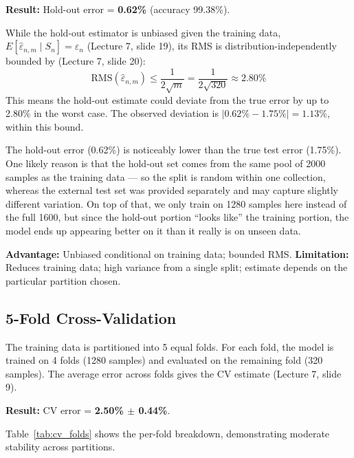 \documentclass[11pt]{article}
\begin{document}
\textbf{Result:} Hold-out error = \textbf{0.62\%} (accuracy 99.38\%).

While the hold-out estimator is unbiased given the training data, $E[\hat{\varepsilon}_{n,m} \mid S_n] = \varepsilon_n$ (Lecture 7, slide 19), its RMS is distribution-independently bounded by (Lecture 7, slide 20):
$$\text{RMS}(\hat{\varepsilon}_{n,m}) \leq \frac{1}{2\sqrt{m}} = \frac{1}{2\sqrt{320}} \approx 2.80\%$$
This means the hold-out estimate could deviate from the true error by up to 2.80\% in the worst case. The observed deviation is $|0.62\% - 1.75\%| = 1.13\%$, within this bound.

The hold-out error (0.62\%) is noticeably lower than the true test error (1.75\%). One likely reason is that the hold-out set comes from the same pool of 2000 samples as the training data --- so the split is random within one collection, whereas the external test set was provided separately and may capture slightly different variation. On top of that, we only train on 1280 samples here instead of the full 1600, but since the hold-out portion ``looks like'' the training portion, the model ends up appearing better on it than it really is on unseen data.

\textbf{Advantage:} Unbiased conditional on training data; bounded RMS. \textbf{Limitation:} Reduces training data; high variance from a single split; estimate depends on the particular partition chosen.

\subsection{5-Fold Cross-Validation}
The training data is partitioned into 5 equal folds. For each fold, the model is trained on 4 folds (1280 samples) and evaluated on the remaining fold (320 samples). The average error across folds gives the CV estimate (Lecture 7, slide 9).

\textbf{Result:} CV error = \textbf{2.50\% $\pm$ 0.44\%}.

Table~\ref{tab:cv_folds} shows the per-fold breakdown, demonstrating moderate stability across partitions.
\end{document}
